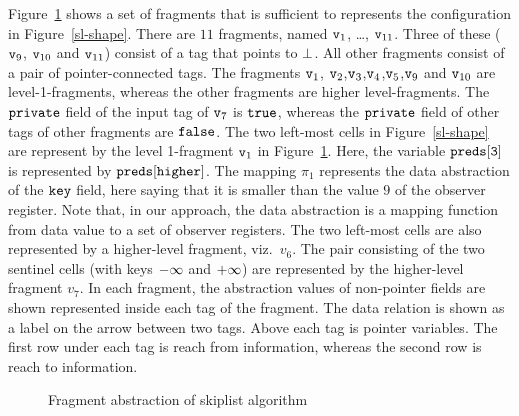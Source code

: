Figure~\ref{fig:skiplistabs} shows a set of fragments that is sufficient to
represents the configuration in Figure~\ref{sl-shape}. There are $11$ fragments, named $\mathtt{v}_1$, \ldots , $\mathtt{v}_{11}$. Three of
these ($\mathtt{v}_9$, $\mathtt{v}_{10}$ and $\mathtt{v}_{11}$) consist of a tag that points to $\bot$. All other fragments consist of a pair of pointer-connected tags. The fragments $\mathtt{v}_1$, $\mathtt{v}_2$,$\mathtt{v}_3$,$\mathtt{v}_4$,$\mathtt{v}_5$,$\mathtt{v}_9$ and $\mathtt{v}_{10}$ are level-1-fragments, whereas the other fragments are higher level-fragments. The $\tt private$ field of the input tag of $\mathtt{v}_7$ is $\tt true$, whereas the $\tt private$ field of other tags of other fragments are $\tt false$. The two left-most cells
in Figure~\ref{sl-shape} are represent by the level 1-fragment $\mathtt{v}_1$ in
Figure~\ref{fig:skiplistabs}. Here, the variable $\tt preds[3]$ is represented by $\tt preds[higher]$. The mapping $\pi_1$ represents the data abstraction of the $\tt key$ field, here saying that it is smaller than the value $9$ of the observer register. Note that, in our approach, the data abstraction is a mapping function from data value to a set of observer registers.
The two left-most cells are also represented by
a higher-level fragment, viz.\ $v_6$.
The pair consisting of the two sentinel cells (with keys $\tt -\infty$ and $\tt +\infty$) are represented by the higher-level fragment $v_7$. In each fragment, the abstraction values of non-pointer fields are shown represented inside each tag of the fragment. The data relation is shown as a label on the  arrow between two tags. Above each tag is pointer variables. The first row under each tag is reach from information, whereas the second row is reach to information.
 \begin{figure}
\center
	
\caption{Fragment abstraction of skiplist algorithm}
\label{fig:skiplistabs}
\vspace*{-0.6cm}
\end{figure} 





